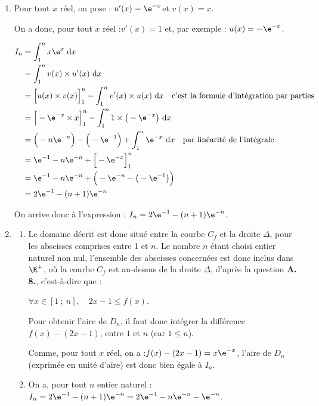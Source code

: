 \begin{enumerate}
\item Pour tout $x$ réel, on pose : \quad $u'(x) = \e^{-x}$\quad et \quad$v(x) = x$.

On a donc, pour tout $x$ réel :\quad $v'(x) = 1$ \quad et, par exemple : \quad$u(x) = -\e^{-x}$.

$\begin{aligned} \displaystyle
I_{n}&= \int_{1}^{n} x\e^{x} ~\mathrm{d} x   \\
	&=\int_{1}^{n} v(x)\times u'(x)  ~\mathrm{d} x\\
	&= \Big[u(x) \times v(x)\Big]_1^n - \int_{1}^{n} v'(x)\times u(x) ~\mathrm{d} x\quad \text{c'est la formule d'intégration par parties}\\
	&= \Big[-\e^{-x} \times x\Big]_1^n - \int_{1}^{n} 1\times \big(-\e^{-x}\big) ~\mathrm{d} x\\
	&= \Big(-n\e^{-n}\Big)-\Big(-\e^{-1}\Big) + \int_{1}^{n} \e^{-x} ~\mathrm{d} x\quad \text{par linéarité de l'intégrale.}\\
	&= \e^{-1} -n\e^{-n} + \Big[-\e^{-x}\Big]_1^n\\
	&= \e^{-1} -n\e^{-n} + \Big(-\e^{-n} - \big(-\e^{-1}\big)\Big)\\
	&= 2\e^{-1} - (n+1)\e^{-n}
\end{aligned}$

On arrive donc à l'expression : \quad $I_n = 2\e^{-1} - (n+1)\e^{-n}$.
\item 
	\begin{enumerate}
		\item Le domaine décrit est donc situé entre la courbe $C_f$ et la droite $\Delta$, pour les abscisses comprises entre 1 et $n$. Le nombre $n$ étant choisi entier naturel non nul, l'ensemble des abscisses concernées est donc inclus dans $\R^{+}$, où la courbe $C_f$ est au-dessus de la droite $\Delta$, d'après la question \textbf{A. 8.}, c'est-à-dire que :

$\forall x \in [1 ~;~n], \quad 2x - 1 \leqslant f(x)$.

Pour obtenir l'aire de $D_n$, il faut donc intégrer la différence $f(x) - (2x - 1)$, entre $1$ et $n$ (car $1 \leqslant n$).

Comme, pour tout $x$ réel, on a :\quad $f(x) - (2x-1) = x\e^{-x}$, \quad l'aire de $D_n$ (exprimée en unité d'aire) est donc bien égale à $I_n$.

		\item On a, pour tout $n$ entier naturel :\quad $I_n = 2\e^{-1} - (n+1)\e^{-n} = 2\e^{-1} - n\e^{-n} -\e^{-n}$.


\end{enumerate}
\end{enumerate}
